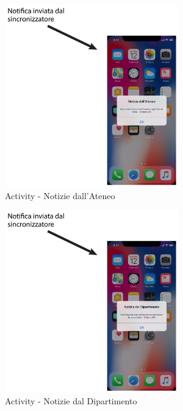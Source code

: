 \begin{figure}
	\centering
	\includegraphics[width=0.67\textwidth]{imgs/gruppo2/activity-notifiche-notizie-ateneo}
	\caption{Activity - Notizie dall'Ateneo}
	\label{fig:activity-notifiche-notizie-ateneo}
\end{figure}

\begin{figure}
	\centering
	\includegraphics[width=0.67\textwidth]{imgs/gruppo2/activity-notifiche-notizie-dipartimento}
	\caption{Activity - Notizie dal Dipartimento}
	\label{fig:activity-notifiche-notizie-dipartimento}
\end{figure}

